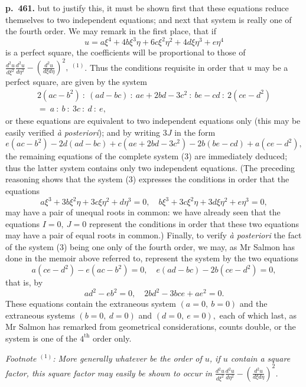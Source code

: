 \documentclass[11pt]{article}
\begin{document}
\bigskip
\noindent\textbf{p.~461.} but to justify this, it must be shown first that these equations reduce themselves to two independent equations; and next that system is really one of the fourth order. We may remark in the first place, that if
\[ u = a\xi^4 + 4b\xi^3\eta + 6c\xi^2\eta^2 + 4d\xi\eta^3 + e\eta^4 \]
is a perfect square, the coefficients will be proportional to those of $\frac{d^2 u}{d\xi^2}\frac{d^2 u}{d\eta^2} - \left(\frac{d^2 u}{d\xi d\eta}\right)^2,\ ^{(1)}$. Thus the conditions requisite in order that $u$ may be a perfect square, are given by the system
\[
\begin{aligned}
2(ac - b^2)\ :\ (ad - bc)\ :\ ae + 2bd - 3c^2\ :\ be - cd\ :\ 2(ce - d^2)\\
=\ a\ :\ b\ :\ 3c\ :\ d\ :\ e,
\end{aligned}
\]
or these equations are equivalent to two independent equations only (this may be easily verified \textit{\`a posteriori}); and by writing $3J$ in the form
\[ e(ac - b^2) - 2d(ad - bc) + c(ae + 2bd - 3c^2) - 2b(be - cd) + a(ce - d^2), \]
the remaining equations of the complete system (3) are immediately deduced; thus the latter system contains only two independent equations. (The preceding reasoning shows that the system (3) expresses the conditions in order that the equations
\[ a\xi^3 + 3b\xi^2\eta + 3c\xi\eta^2 + d\eta^3 = 0,\quad b\xi^3 + 3c\xi^2\eta + 3d\xi\eta^2 + e\eta^3 = 0, \]
may have a pair of unequal roots in common: we have already seen that the equations $I = 0,\ J = 0$ represent the conditions in order that these two equations may have a pair of equal roots in common.) Finally, to verify \textit{\`a posteriori} the fact of the system (3) being one only of the fourth order, we may, as Mr Salmon has done in the memoir above referred to, represent the system by the two equations
\[ a(ce - d^2) - e(ac - b^2) = 0,\quad e(ad - bc) - 2b(ce - d^2) = 0, \]
that is, by
\[ ad^2 - eb^2 = 0,\quad 2bd^2 - 3bce + ae^2 = 0. \]
These equations contain the extraneous system $(a = 0,\ b = 0)$ and the extraneous systems $(b = 0,\ d = 0)$ and $(d = 0,\ e = 0),$ each of which last, as Mr Salmon has remarked from geometrical considerations, counts double, or the system is one of the $4^{\text{th}}$ order only.

\noindent\textit{Footnote $^{(1)}$: More generally whatever be the order of $u$, if $u$ contain a square factor, this square factor may easily be shown to occur in $\frac{d^2 u}{d\xi^2}\frac{d^2 u}{d\eta^2} - \left(\frac{d^2 u}{d\xi d\eta}\right)^2$.}
\end{document}
